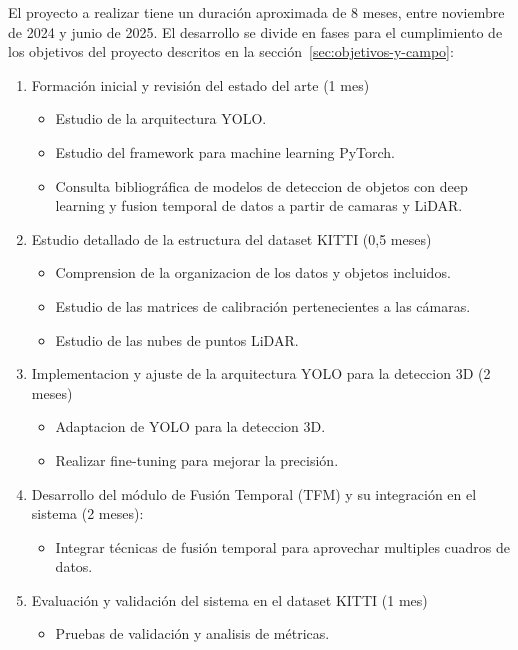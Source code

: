 El proyecto a realizar tiene un duración aproximada de 8 meses, entre noviembre de 2024 y junio de 2025. El desarrollo se divide en fases para el cumplimiento de los objetivos del proyecto descritos en la sección~\ref{sec:objetivos-y-campo}:

\begin{enumerate}
  
\item Formación inicial y revisión del estado del arte (1 mes)
  \begin{itemize}
  \item Estudio de la arquitectura YOLO.
  \item Estudio del framework para machine learning PyTorch.
  \item Consulta bibliográfica de modelos de deteccion de objetos con deep learning y fusion temporal de datos a partir de camaras y LiDAR. 
  \end{itemize}

\item Estudio detallado de la estructura del dataset KITTI (0,5 meses)
\begin{itemize}
	\item Comprension de la organizacion de los datos y objetos incluidos.
	\item Estudio de las matrices de calibración pertenecientes a las cámaras.
	\item Estudio de las nubes de puntos LiDAR.
\end{itemize}
	

\item Implementacion y ajuste de la arquitectura YOLO para la deteccion 3D (2 meses)
  \begin{itemize}
  \item Adaptacion de YOLO para la deteccion 3D.
  \item Realizar fine-tuning para mejorar la precisión.
  \end{itemize}
  

\item Desarrollo del módulo de Fusión Temporal (TFM) y su integración en el sistema (2 meses):
  \begin{itemize}
  \item Integrar técnicas de fusión temporal para aprovechar multiples cuadros de datos.
  \end{itemize}

\item Evaluación y validación del sistema en el dataset KITTI (1 mes)
	\begin{itemize}
		\item Pruebas de validación y analisis de métricas.
	\end{itemize}


\end{enumerate}
